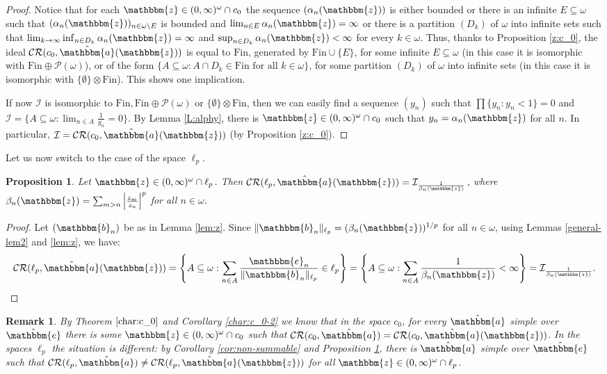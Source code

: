 \documentclass{amsart}
\newcommand{\I}{\mathcal{I}}
\newcommand{\Fin}{\mathrm{Fin}}
\newcommand{\CR}{\mathcal{CR}}
\newcommand{\w}{\mathbbm}
\newtheorem{proposition}[theorem]{Proposition}
\newtheorem{remark}[theorem]{Remark}
\begin{document}
\begin{proof}
Notice that for each $\w{z}\in (0,\infty)^\omega\cap c_0$ the sequence $(\alpha_n(\w{z}))$ is either bounded or there is an infinite $E\subseteq\omega$ such that $(\alpha_n(\w{z}))_{n\in\omega\setminus E}$ is bounded and $\lim_{n\in E}\alpha_n(\w{z})=\infty$ or there is a partition $(D_k)$ of $\omega$ into infinite sets such that $\lim_{k\to\infty}\inf_{n \in D_k} \alpha_n(\w{z})=\infty$ and $\sup_{n \in D_k} \alpha_n(\w{z}) < \infty$ for every $k\in\omega$. Thus, thanks to Proposition \ref{z:c_0}, the ideal $\CR(c_0,\hat{\w{a}}(\w{z}))$ is equal to $\Fin$, generated by $\Fin\cup\{E\}$, for some infinite $E\subseteq\omega$ (in this case it is isomorphic with $\Fin\oplus\mathcal{P}(\omega)$), or of the form $\{A\subseteq\omega:A\cap D_k\in\Fin\text{ for all }k\in\omega\}$, for some partition $(D_k)$ of $\omega$ into infinite sets (in this case it is isomorphic with $\{\emptyset\}\otimes\Fin$). This shows one implication.

If now $\I$ is isomorphic to $\Fin, \Fin\oplus\mathcal{P}(\omega)$ or $\{\emptyset\}\otimes\Fin$, then we can easily find a sequence $(y_n)$ such that $\prod \{y_n : y_n <1\}=0$ and $\I=\{A\subseteq\omega:\lim_{n\in A}\frac{1}{y_n}=0\}$. By Lemma \ref{L:alphy}, there is $\w{z}\in (0,\infty)^\omega\cap c_0$ such that $y_n=\alpha_n(\w{z})$ for all $n$. In particular, $\I=\CR(c_0,\hat{\w{a}}(\w{z}))$ (by Proposition \ref{z:c_0}).
\end{proof}
   
Let us now switch to the case of the space $\ell_p$. 

\begin{proposition}
\label{z:l_p}
Let $\w{z}\in (0,\infty)^\omega\cap \ell_p$. Then $\CR(\ell_p,\hat{\w{a}}(\w{z}))=\I_{\frac{1}{\beta_n(\w{z})}}$, where $\beta_n(\w{z})=\sum_{m>n}\left|\frac{z_m}{z_n}\right|^p$ for all $n\in\omega$.
\end{proposition}

\begin{proof}
Let $(\w{b}_n)$ be as in Lemma \ref{lem:z}. Since $\|\w{b}_n\|_{\ell_p}=(\beta_n(\w{z}))^{1/p}$ for all $n\in\omega$, using Lemmas \ref{general-lem2} and \ref{lem:z}, we have:
\[
\CR(\ell_p,\hat{\w{a}}(\w{z}))=\left\{A\subseteq\omega:\sum_{n\in A}\frac{\w{e}_n}{\|\w{b}_n\|_{\ell_p}}\in \ell_p\right\}=\left\{A\subseteq\omega: \sum_{n\in A}\frac{1}{\beta_n(\w{z})}<\infty\right\}=\I_{\frac{1}{\beta_n(\w{z})}}.
\]
\end{proof}

\begin{remark}
By Theorem $\ref{char:c_0}$ and Corollary \ref{char:c_0-2} we know that in the space $c_0$, for every $\hat{\w{a}}$ simple over $\hat{\w{e}}$ there is some $\w{z}\in (0,\infty)^\omega\cap c_0$ such that $\CR(c_0, \hat{\w{a}})=\CR(c_0, \hat{\w{a}}(\w{z}))$. In the spaces $\ell_p$ the situation is different: by Corollary \ref{cor:non-summable} and Proposition \ref{z:l_p}, there is $\hat{\w{a}}$ simple over $\hat{\w{e}}$ such that $\CR(\ell_p, \hat{\w{a}})\neq\CR(\ell_p, \hat{\w{a}}(\w{z}))$ for all $\w{z}\in (0,\infty)^\omega\cap \ell_p$.
\end{remark}
\end{document}
